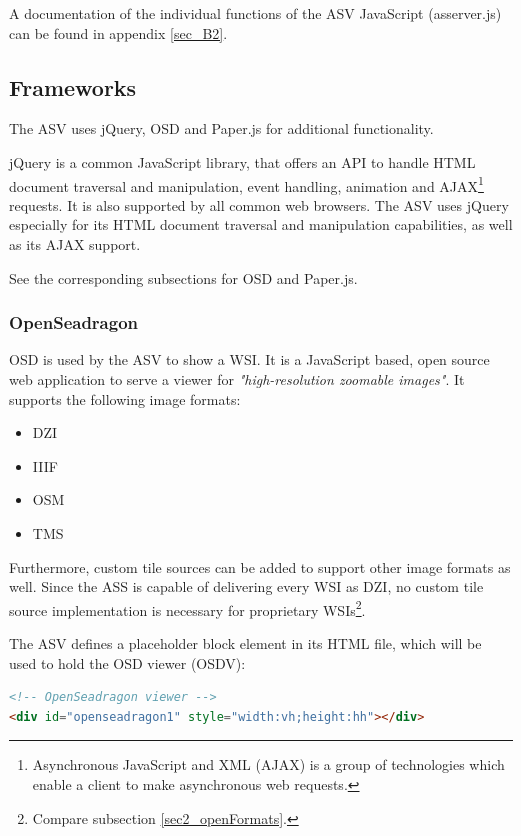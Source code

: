 A documentation of the individual functions of the ASV JavaScript (as{\textunderscore}server.js) can be found in appendix \ref{sec_B2}.

\subsection{Frameworks}
\label{sec4_asvFrameworks}
The ASV uses jQuery, OSD and Paper.js for additional functionality.

jQuery is a common JavaScript library, that offers an API to handle HTML document traversal and manipulation, event handling, animation and AJAX\footnote{
	Asynchronous JavaScript and XML (AJAX) is a group of technologies which enable a client to make asynchronous web requests\cite{Ullman07}.
} requests\cite{web:jquery}. It is also supported by all common web browsers\cite{web:jqueryBS}. The ASV uses jQuery especially for its HTML document traversal and manipulation capabilities, as well as its AJAX support.

See the corresponding subsections for OSD and Paper.js.

\subsubsection{OpenSeadragon}
OSD is used by the ASV to show a WSI. It is a JavaScript based, open source web application to serve a viewer for \emph{"high-resolution zoomable images"}\cite{web:openseadragon}. It supports the following image formats:

\begin{itemize}
	\item DZI
	\item IIIF
	\item OSM
	\item TMS
\end{itemize}

Furthermore, custom tile sources can be added to support other image formats as well. Since the ASS is capable of delivering every WSI as DZI, no custom tile source implementation is necessary for proprietary WSIs\footnote{
	Compare subsection \ref{sec2_openFormats}.
}.

The ASV defines a placeholder block element in its HTML file, which will be used to hold the OSD viewer (OSDV):
\begin{lstlisting}[title=as{\textunderscore}viewer.html, frame=single, language=html]
<!-- OpenSeadragon viewer -->
<div id="openseadragon1" style="width:vh;height:hh"></div>
\end{lstlisting}

